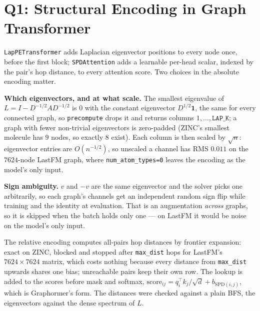\section{Q1: Structural Encoding in Graph Transformer}

\texttt{LapPETransformer} adds Laplacian eigenvector positions to every node once, before the
first block; \texttt{SPDAttention} adds a learnable per-head scalar, indexed by the pair's hop
distance, to every attention score. Two choices in the absolute encoding matter.

\textbf{Which eigenvectors, and at what scale.} The smallest eigenvalue of
$L = I - D^{-1/2} A D^{-1/2}$ is $0$ with the constant eigenvector $D^{1/2}\mathbf{1}$, the same
for every connected graph, so \texttt{precompute} drops it and returns columns
$1,\dots,\texttt{LAP\_K}$; a graph with fewer non-trivial eigenvectors is zero-padded (ZINC's
smallest molecule has $9$ nodes, so exactly $8$ exist). Each column is then scaled by $\sqrt{n}$:
eigenvector entries are $O(n^{-1/2})$, so unscaled a channel has RMS $0.011$ on the $7624$-node
LastFM graph, where \texttt{num\_atom\_types=0} leaves the encoding as the model's only input.

\textbf{Sign ambiguity.} $v$ and $-v$ are the same eigenvector and the solver picks one
arbitrarily, so each graph's channels get an independent random sign flip while training and the
identity at evaluation. That is an augmentation \emph{across} graphs, so it is skipped when the
batch holds only one --- on LastFM it would be noise on the model's only input.

The relative encoding computes all-pairs hop distances by frontier expansion: exact on ZINC,
blocked and stopped after \texttt{max\_dist} hops for LastFM's $7624 \times 7624$ matrix, which
costs nothing because every distance from \texttt{max\_dist} upwards shares one bias;
unreachable pairs keep their own row. The lookup is added to the scores before mask and softmax,
$\mathrm{score}_{ij} = q_i^\top k_j/\sqrt{d} + b_{\mathrm{SPD}(i,j)}$, which is Graphormer's
form. The distances were checked against a plain BFS, the eigenvectors against the dense
spectrum of $L$.

